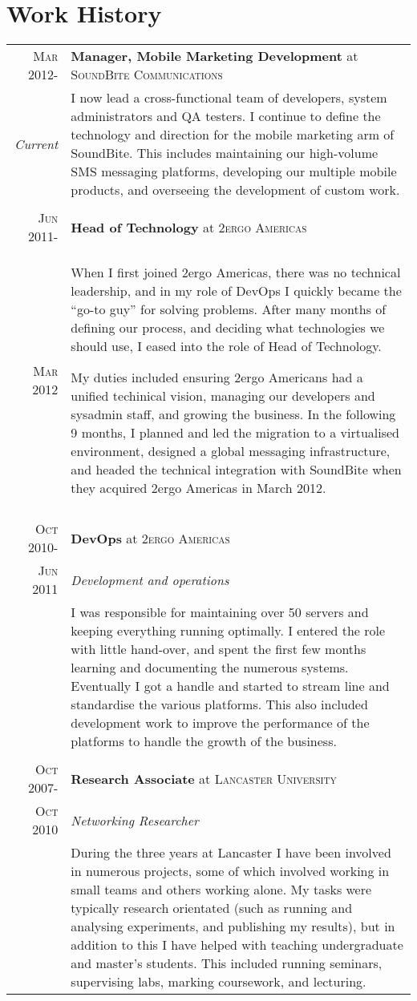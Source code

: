 \documentclass[a4paper,10pt]{article}
\begin{document}
\section{Work History}
\begin{tabular}{r|p{13.5cm}}

 \textsc{Mar 2012-} & \textbf{Manager, Mobile Marketing Development} at \textsc{SoundBite Communications} \\
 \emph{Current}     & I now lead a cross-functional team of developers, system administrators and QA testers. I continue to define
			the technology and direction for the mobile marketing arm of SoundBite. This includes maintaining our high-volume
			SMS messaging platforms, developing our multiple mobile products, and overseeing the development of custom work.\\
&\\
 \textsc{Jun 2011-} & \textbf{Head of Technology} at \textsc{2ergo Americas} \\
 \textsc{Mar 2012}  & When I first joined 2ergo Americas, there was no technical leadership, and in my role of DevOps
			I quickly became the ``go-to guy'' for solving problems. After many months of defining our process, and
			deciding what technologies we should use, I eased into the role of Head of Technology.

                        My duties included ensuring 
			2ergo Americans had a unified techinical vision, managing our developers and sysadmin staff, and growing the business.
			In the following 9 months, I planned and led the migration to a virtualised environment, designed a global messaging
			infrastructure, and headed the technical integration with SoundBite when they acquired 2ergo Americas in March 2012. \\
&\\
 \textsc{Oct 2010-} & \textbf{DevOps} at \textsc{2ergo Americas} \\
 \textsc{Jun 2011}  & \emph{Development and operations}\\
                    & I was responsible for maintaining over 50 servers and keeping everything running optimally. 
			I entered the role with little hand-over, and spent the first few months learning and documenting the numerous systems.
			Eventually I got a handle and started to stream line and standardise the various platforms. This also included 
			development work to improve the performance of the platforms to handle the growth of the business. \\
&\\
 \textsc{Oct 2007-} & \textbf{Research Associate} at \textsc{Lancaster University} \\
 \textsc{Oct 2010}  & \emph{Networking Researcher}\\
                    & During the three years at Lancaster I have been involved in numerous projects, some of which involved working in small teams and
			others working alone. My tasks were typically research orientated (such as running and analysing experiments, and publishing my 
			results), but in addition to this I have helped with teaching undergraduate and master's students. This included running seminars,
			supervising labs, marking coursework, and lecturing.


\end{tabular}
\end{document}
